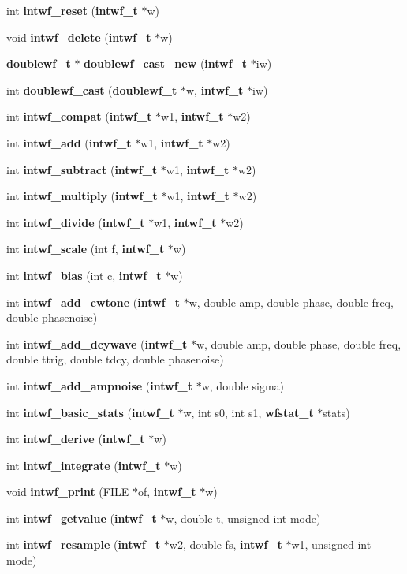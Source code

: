 \begin{CompactItemize}
\item 
int {\bf intwf\_\-reset} ({\bf intwf\_\-t} $\ast$w)
\item 
void {\bf intwf\_\-delete} ({\bf intwf\_\-t} $\ast$w)
\item 
{\bf doublewf\_\-t} $\ast$ {\bf doublewf\_\-cast\_\-new} ({\bf intwf\_\-t} $\ast$iw)
\item 
int {\bf doublewf\_\-cast} ({\bf doublewf\_\-t} $\ast$w, {\bf intwf\_\-t} $\ast$iw)
\item 
int {\bf intwf\_\-compat} ({\bf intwf\_\-t} $\ast$w1, {\bf intwf\_\-t} $\ast$w2)
\item 
int {\bf intwf\_\-add} ({\bf intwf\_\-t} $\ast$w1, {\bf intwf\_\-t} $\ast$w2)
\item 
int {\bf intwf\_\-subtract} ({\bf intwf\_\-t} $\ast$w1, {\bf intwf\_\-t} $\ast$w2)
\item 
int {\bf intwf\_\-multiply} ({\bf intwf\_\-t} $\ast$w1, {\bf intwf\_\-t} $\ast$w2)
\item 
int {\bf intwf\_\-divide} ({\bf intwf\_\-t} $\ast$w1, {\bf intwf\_\-t} $\ast$w2)
\item 
int {\bf intwf\_\-scale} (int f, {\bf intwf\_\-t} $\ast$w)
\item 
int {\bf intwf\_\-bias} (int c, {\bf intwf\_\-t} $\ast$w)
\item 
int {\bf intwf\_\-add\_\-cwtone} ({\bf intwf\_\-t} $\ast$w, double amp, double phase, double freq, double phasenoise)
\item 
int {\bf intwf\_\-add\_\-dcywave} ({\bf intwf\_\-t} $\ast$w, double amp, double phase, double freq, double ttrig, double tdcy, double phasenoise)
\item 
int {\bf intwf\_\-add\_\-ampnoise} ({\bf intwf\_\-t} $\ast$w, double sigma)
\item 
int {\bf intwf\_\-basic\_\-stats} ({\bf intwf\_\-t} $\ast$w, int s0, int s1, {\bf wfstat\_\-t} $\ast$stats)
\item 
int {\bf intwf\_\-derive} ({\bf intwf\_\-t} $\ast$w)
\item 
int {\bf intwf\_\-integrate} ({\bf intwf\_\-t} $\ast$w)
\item 
void {\bf intwf\_\-print} (FILE $\ast$of, {\bf intwf\_\-t} $\ast$w)
\item 
int {\bf intwf\_\-getvalue} ({\bf intwf\_\-t} $\ast$w, double t, unsigned int mode)
\item 
int {\bf intwf\_\-resample} ({\bf intwf\_\-t} $\ast$w2, double fs, {\bf intwf\_\-t} $\ast$w1, unsigned int mode)
\end{CompactItemize}
